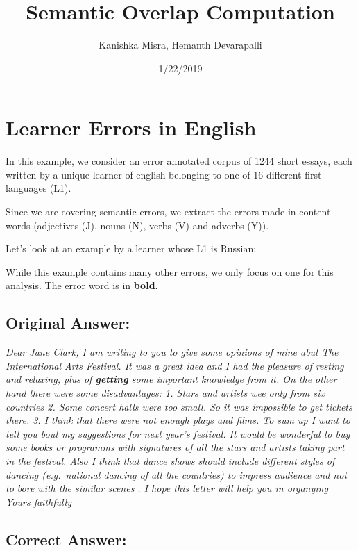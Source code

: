 \documentclass[]{article}
\title{Semantic Overlap Computation}
\author{Kanishka Misra, Hemanth Devarapalli}
\date{1/22/2019}
\begin{document}
\maketitle

\hypertarget{learner-errors-in-english}{%
\section{Learner Errors in English}\label{learner-errors-in-english}}

In this example, we consider an error annotated corpus of 1244 short
essays, each written by a unique learner of english belonging to one of
16 different first languages (L1).

Since we are covering semantic errors, we extract the errors made in
content words (adjectives (J), nouns (N), verbs (V) and adverbs (Y)).

Let's look at an example by a learner whose L1 is Russian:

While this example contains many other errors, we only focus on one for
this analysis. The error word is in \textbf{bold}.

\hypertarget{original-answer}{%
\subsection{Original Answer:}\label{original-answer}}

\emph{Dear Jane Clark, I am writing to you to give some opinions of mine
abut The International Arts Festival. It was a great idea and I had the
pleasure of resting and relaxing, plus of \textbf{getting} some
important knowledge from it. On the other hand there were some
disadvantages: 1. Stars and artists wee only from six countries 2. Some
concert halls were too small. So it was impossible to get tickets there.
3. I think that there were not enough plays and films. To sum up I want
to tell you bout my suggestions for next year's festival. It would be
wonderful to buy some books or programms with signatures of all the
stars and artists taking part in the festival. Also I think that dance
shows should include different styles of dancing (e.g.~national dancing
of all the countries) to impress audience and not to bore with the
similar scenes . I hope this letter will help you in organying Yours
faithfully}

\hypertarget{correct-answer}{%
\subsection{Correct Answer:}\label{correct-answer}}
\end{document}
